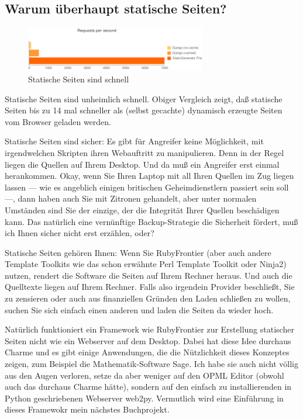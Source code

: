 \documentclass[11pt]{report}
\begin{document}
\subsection{Warum überhaupt statische Seiten?}
\label{sec-1-1-2-1}


\begin{figure}[h!]
\centering
\includegraphics[width=0.7\textwidth]{./images/staticgenerator-chart.png}
\caption{\label{staticpages}Statische Seiten sind schnell}
\end{figure}

Statische Seiten sind unheimlich schnell. Obiger Vergleich zeigt, daß
statische Seiten bis zu 14 mal schneller als (selbst gecachte)
dynamisch erzeugte Seiten vom Browser geladen werden.


Statische Seiten sind sicher: Es gibt für Angreifer keine Möglichkeit,
mit irgendwelchen Skripten ihren Webauftritt zu manipulieren. Denn in
der Regel liegen die Quellen auf Ihrem Desktop. Und da muß ein
Angreifer erst einmal herankommen. Okay, wenn Sie Ihren Laptop mit all
Ihren Quellen im Zug liegen lassen — wie es angeblich einigen
britischen Geheimdienstlern passiert sein soll —, dann haben auch Sie
mit Zitronen gehandelt, aber unter normalen Umständen sind Sie der
einzige, der die Integrität Ihrer Quellen beschädigen kann. Das
natürlich eine vernünftige Backup-Strategie die Sicherheit fördert,
muß ich Ihnen sicher nicht erst erzählen, oder?


Statische Seiten gehören Ihnen: Wenn Sie RubyFrontier (aber auch
andere Template Toolkits wie das schon erwähnte Perl Template Toolkit
oder Ninja2) nutzen, rendert die Software die Seiten auf Ihrem Rechner
heraus. Und auch die Quelltexte liegen auf Ihrem Rechner. Falls also
irgendein Provider beschließt, Sie zu zensieren oder auch aus
finanziellen Gründen den Laden schließen zu wollen, suchen Sie sich
einfach einen anderen und laden die Seiten da wieder hoch.


Natürlich funktioniert ein Framework wie RubyFrontier zur Erstellung
statischer Seiten nicht wie ein Webserver auf dem Desktop. Dabei hat
diese Idee durchaus Charme und es gibt einige Anwendungen, die die
Nützlichkeit dieses Konzeptes zeigen, zum Beispiel die
Mathematik-Software Sage. Ich habe sie auch nicht völlig aus den Augen
verloren, setze da aber weniger auf den OPML Editor (obwohl auch das
durchaus Charme hätte), sondern auf den einfach zu installierenden in
Python geschriebenen Webserver web2py. Vermutlich wird eine Einführung
in dieses Framewokr mein nächstes Buchprojekt.
\end{document}
